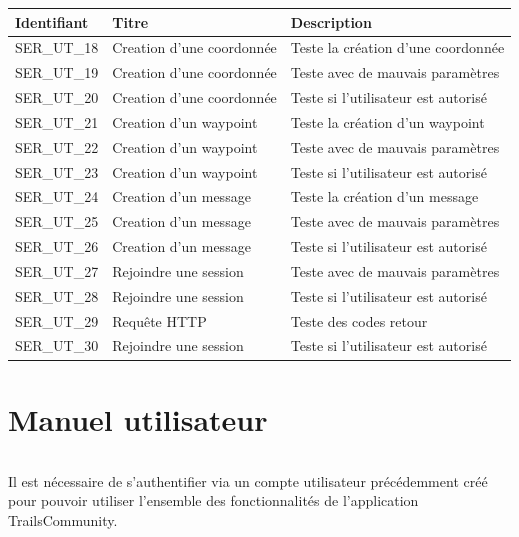 \documentclass[titlepage, 12pt]{report}
\begin{document}
\begin{table}[ht]
\begin{tabularx}{\textwidth}{|X|X|X|}
\hline
Identifiant & Titre & Description \\
\hline
SER\_UT\_18 & Creation d'une coordonnée &  Teste la création d'une coordonnée \\
\hline
SER\_UT\_19 & Creation d'une coordonnée &  Teste avec de mauvais paramètres \\
\hline
SER\_UT\_20 & Creation d'une coordonnée &  Teste si l'utilisateur est autorisé \\
\hline
SER\_UT\_21 & Creation d'un waypoint &  Teste la création d'un waypoint \\
\hline
SER\_UT\_22 & Creation d'un waypoint &  Teste avec de mauvais paramètres \\
\hline
SER\_UT\_23 & Creation d'un waypoint &  Teste si l'utilisateur est autorisé \\
\hline
SER\_UT\_24 & Creation d'un message &  Teste la création d'un message \\
\hline
SER\_UT\_25 & Creation d'un message &  Teste avec de mauvais paramètres \\
\hline
SER\_UT\_26 & Creation d'un message &  Teste si l'utilisateur est autorisé \\
\hline
SER\_UT\_27 & Rejoindre une session &  Teste avec de mauvais paramètres \\
\hline
SER\_UT\_28 & Rejoindre une session &  Teste si l'utilisateur est autorisé \\
\hline
SER\_UT\_29 & Requête HTTP &  Teste des codes retour \\
\hline
SER\_UT\_30 & Rejoindre une session &  Teste si l'utilisateur est autorisé \\


\hline
\end{tabularx}
\end{table}

\part{Manuel utilisateur}

\paragraph{}Il est nécessaire de s'authentifier via un compte utilisateur précédemment créé pour pouvoir utiliser l'ensemble des fonctionnalités de l'application TrailsCommunity.
\end{document}
